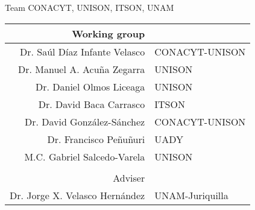 \begin{frame}{Team CONACYT, UNISON, ITSON, UNAM }
    \begin{center}
        \begin{tabular}{rl}
            Working group
            \\
            \midrule
            Dr. Saúl Díaz Infante Velasco
            &
                CONACYT-UNISON
            \\
            Dr. Manuel A. Acu\~na Zegarra
            &
                UNISON
            \\
            Dr. Daniel Olmos Liceaga
            &
                UNISON
            \\
            Dr. David Baca Carrasco
            &
                ITSON
           \\
           Dr. David Gonz\'alez-S\'anchez
            &
            CONACYT-UNISON
           \\
           Dr. Francisco Pe\~nu\~nuri
           & UADY
           \\
            M.C. Gabriel Salcedo-Varela
            & UNISON
            \\
            \\
           Adviser
           \\
           \midrule
            Dr. Jorge X. Velasco Hern\'andez
            &
            UNAM-Juriquilla
            
        \end{tabular}
    \end{center}
\end{frame}